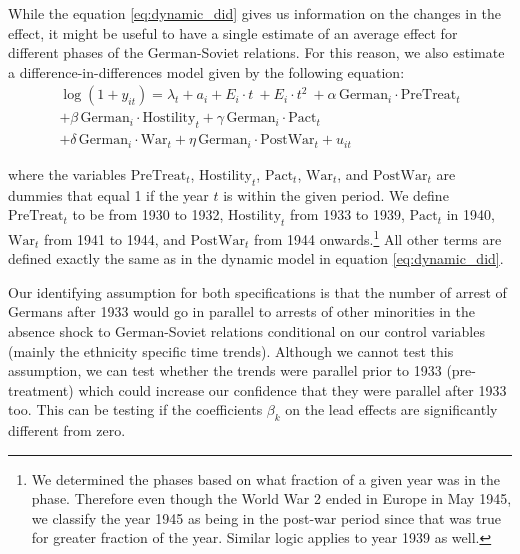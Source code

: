While the equation \ref{eq:dynamic_did} gives us information on the changes in the effect, it might be useful to have a single estimate of an average effect for different phases of the German-Soviet relations. For this reason, we also estimate a difference-in-differences model given by the following equation:
\begin{equation}
\begin{aligned}
 \log\left(1 + y_{it}\right) = 
 \lambda_t + a_i +  E_i \cdot t \:  + E_i \cdot t^2 \: +
  \alpha \, \text{German}_{i} \cdot \text{PreTreat}_{t}   \\ %
  + \beta \, \text{German}_{i} \cdot \text{Hostility}_{t} +
 \gamma \, \text{German}_{i} \cdot \text{Pact}_{t}  \\
 + \delta \, \text{German}_{i} \cdot \text{War}_{t} +
 \eta \, \text{German}_{i} \cdot \text{PostWar}_{t}  + u_{it}
 \label{eq:simple_did}
 \end{aligned}
\end{equation}


where the variables $\text{PreTreat}_{t}$, $\text{Hostility}_{t}$, $\text{Pact}_{t}$, $\text{War}_{t}$, and $\text{PostWar}_{t}$  are dummies that equal 1 if the year $t$ is within the given period. We define  $\text{PreTreat}_{t}$ to be from 1930 to 1932, $\text{Hostility}_{t}$ from 1933 to 1939, $\text{Pact}_{t}$ in 1940, $\text{War}_{t}$ from 1941 to 1944, and $\text{PostWar}_{t}$ from 1944 onwards.\footnote{We determined the phases based on what fraction of a given year was in the phase. Therefore even though the  World War 2  ended in Europe in May 1945, we  classify the year 1945 as being in the post-war period since that was true for greater fraction of the year. Similar logic applies to year 1939 as well. }
All other terms are defined exactly the same as in the dynamic model in equation \ref{eq:dynamic_did}.


Our identifying assumption for both specifications is that the number of arrest of Germans after 1933 would go in parallel to arrests of other minorities in the absence shock to German-Soviet relations conditional on our control variables (mainly the ethnicity specific time trends). Although we cannot test this assumption, we can test whether the trends were parallel prior to 1933 (pre-treatment) which could increase our confidence that they were parallel after 1933 too. This can be testing if the coefficients $\beta_k$ on the lead effects are significantly different from zero.  

